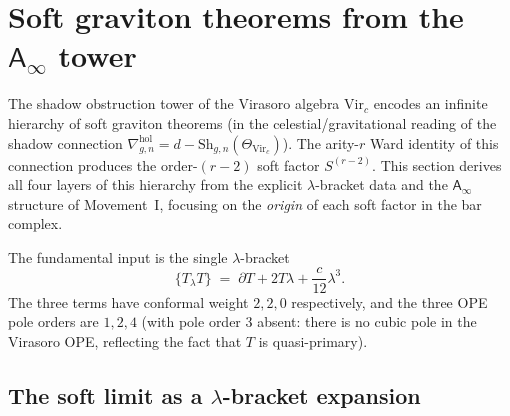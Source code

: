 \documentclass[11pt]{article}
\newcommand{\Ainf}{\mathsf{A}_{\infty}}
\begin{document}
\section{Soft graviton theorems from the $\Ainf$ tower}
\label{sec:soft-graviton-ainf-tower}

The shadow obstruction tower of the Virasoro algebra
$\mathrm{Vir}_c$ encodes an infinite hierarchy of soft
graviton theorems (in the celestial/gravitational reading of
the shadow connection $\nabla^{\mathrm{hol}}_{g,n} =
d - \mathrm{Sh}_{g,n}(\Theta_{\mathrm{Vir}_c})$).
The arity-$r$ Ward identity of this connection produces
the order-$(r-2)$ soft factor $S^{(r-2)}$.  This section
derives all four layers of this hierarchy from the explicit
$\lambda$-bracket data and the $\Ainf$ structure of
Movement~I, focusing on the \emph{origin} of each soft factor
in the bar complex.

The fundamental input is the single $\lambda$-bracket
\begin{equation}\label{eq:soft-input}
\{T{}_\lambda T\}
\;=\;
\partial T + 2T\lambda + \frac{c}{12}\lambda^3.
\end{equation}
The three terms have conformal weight $2, 2, 0$ respectively,
and the three OPE pole orders are $1, 2, 4$ (with pole order 3
absent: there is no cubic pole in the Virasoro OPE, reflecting
the fact that $T$ is quasi-primary).

\subsection{The soft limit as a $\lambda$-bracket expansion}
\end{document}
